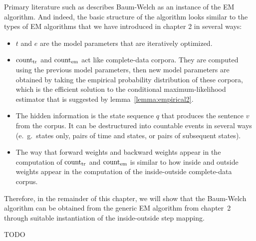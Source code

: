 Primary literature such as \cite{vogler2015} describes Baum-Welch as an
instance of the EM algorithm. And indeed, the basic structure of the algorithm
looks similar to the types of EM algorithms that we have introduced in chapter
2 in several ways:
\begin{itemize}
 \item $t$ and $e$ are the model parameters that are iteratively optimized.
 \item $\operatorname{count}_\mathrm{tr}$ and $\operatorname{count}_\mathrm{em}$ act like complete-data
  corpora. They are computed using the previous model parameters, then new
  model parameters are obtained by taking the empirical probability
  distribution of these corpora, which is the efficient solution to the
  conditional maximum-likelihood estimator that is suggested by
  lemma~\ref{lemma:empirical2}.
 \item The hidden information is the state sequence $q$ that produces the
  sentence $v$ from the corpus. It can be destructured into countable events in
  several ways (e.~g.~states only, pairs of time and states, or pairs of
  subsequent states).
 \item The way that forward weights and backward weights appear in the computation of $\operatorname{count}_\mathrm{tr}$ and $\operatorname{count}_\mathrm{em}$ is similar to how inside and outside weights appear in the computation of the inside-outside complete-data corpus.
\end{itemize}

Therefore, in the remainder of this chapter, we will show that the Baum-Welch
algorithm can be obtained from the generic EM algorithm from chapter~2 through
suitable instantiation of the inside-outside step mapping.

{\color{red}TODO}
